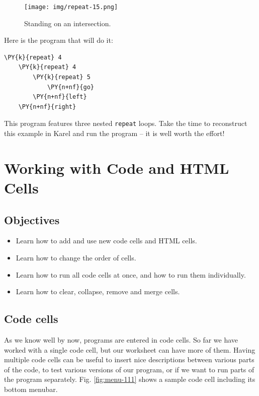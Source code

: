 \newpage
\begin{figure}[!ht]
\begin{center}
\texttt{[image: img/repeat-15.png]}
\vspace{-0mm}
\caption{Standing on an intersection.}
\label{fig:repeat-15}
\end{center}
\end{figure}
\noindent
Here is the program that will do it:\\

\begin{bbox}
\begin{Verbatim}[commandchars=\\\{\}]
\PY{k}{repeat} 4
    \PY{k}{repeat} 4
        \PY{k}{repeat} 5
            \PY{n+nf}{go}
        \PY{n+nf}{left}
    \PY{n+nf}{right}
\end{Verbatim}
\end{bbox}
\vspace{6mm}

\noindent
This program features three nested {\tt repeat} loops. Take the time to 
reconstruct this example in Karel and run the program -- it is well worth the effort!

\section{Working with Code and HTML Cells} \label{sec:editmenu}

\subsection{Objectives} 
 
\begin{itemize}
\item Learn how to add and use new code cells and HTML cells.
\item Learn how to change the order of cells.
\item Learn how to run all code cells at once, and how to run them individually.
\item Learn how to clear, collapse, remove and merge cells.
\end{itemize}

\subsection{Code cells}

As we know well by now, programs are entered in code cells. So far we have worked with 
a single code cell, but our worksheet can have more of them. 
Having multiple code cells can be useful to insert nice descriptions 
between various parts of the code, to test various versions 
of our program, or if we want to run parts of the program separately. Fig. 
\ref{fig:menu-111} shows a sample code cell including its bottom menubar. 

